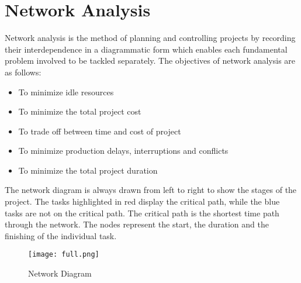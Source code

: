 \chapter*{Network Analysis}

\noindent Network analysis is the method of planning and controlling projects by recording their interdependence in a diagrammatic form which enables each fundamental problem involved to be tackled separately. The objectives of network analysis are as follows:
\begin{itemize}
  \item To minimize idle resources
  \item To minimize the total project cost
  \item To trade off between time and cost of project
  \item To minimize production delays, interruptions and conflicts
  \item To minimize the total project duration
\end{itemize}

\noindent The network diagram is always drawn from left to right to show the stages of the project. The tasks highlighted in red display the critical path, while the blue tasks are not on the critical path. The critical path is the shortest time path through the network. The nodes represent the start, the duration and
the finishing of the individual task.

\begin{figure}[H]
\centering
{\texttt{[image: full.png]}}
\caption{Network Diagram}
\end{figure}

